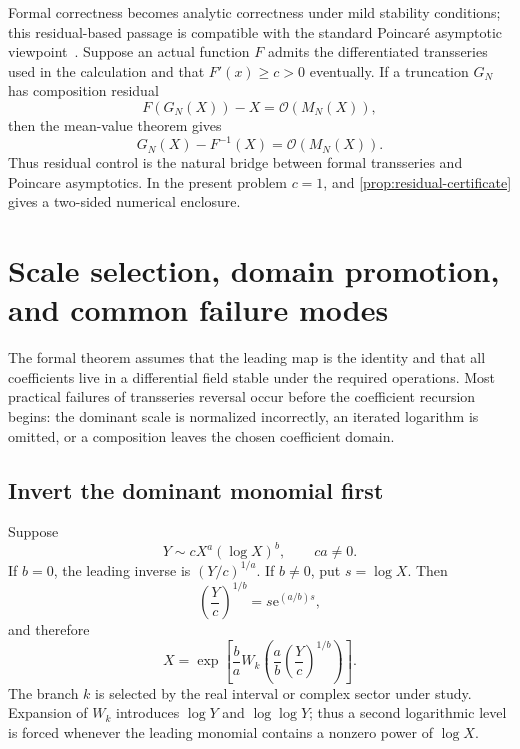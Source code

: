 \documentclass[11pt,a4paper]{article}
\numberwithin{equation}{section}
\theoremstyle{definition}
\theoremstyle{remark}
\newcommand{\e}{\mathrm e}
\newcommand{\Ord}{\mathcal O}
\begin{document}
Formal correctness becomes analytic correctness under mild stability
conditions; this residual-based passage is compatible with the standard
Poincar\'e asymptotic viewpoint~\cite{Olver}.  Suppose an actual function \(F\) admits the differentiated
transseries used in the calculation and that \(F'(x)\ge c>0\) eventually.
If a truncation \(G_N\) has composition residual
\begin{equation}\label{eq:formal-to-actual-residual}
  F(G_N(X))-X=\Ord(M_N(X)),
\end{equation}
then the mean-value theorem gives
\begin{equation}\label{eq:formal-to-actual-error}
  G_N(X)-F^{-1}(X)=\Ord(M_N(X)).
\end{equation}
Thus residual control is the natural bridge between formal transseries and
Poincare asymptotics.  In the present problem \(c=1\), and
\cref{prop:residual-certificate} gives a two-sided numerical enclosure.

\section{Scale selection, domain promotion, and common failure modes}

The formal theorem assumes that the leading map is the identity and that
all coefficients live in a differential field stable under the required
operations.  Most practical failures of transseries reversal occur before
the coefficient recursion begins: the dominant scale is normalized
incorrectly, an iterated logarithm is omitted, or a composition leaves the
chosen coefficient domain.

\subsection{Invert the dominant monomial first}

Suppose
\begin{equation}\label{eq:dominant-power-log}
  Y\sim cX^a(\log X)^b,
  \qquad ca\ne0.
\end{equation}
If \(b=0\), the leading inverse is \((Y/c)^{1/a}\).  If \(b\ne0\), put
\(s=\log X\).  Then
\[
  \left(\frac{Y}{c}\right)^{1/b}=s\e^{(a/b)s},
\]
and therefore
\begin{equation}\label{eq:power-log-leading-inverse}
  X=\exp\!\left[
  \frac ba W_k\!\left(
  \frac ab\left(\frac{Y}{c}\right)^{1/b}
  \right)\right].
\end{equation}
The branch \(k\) is selected by the real interval or complex sector under
study.  Expansion of \(W_k\) introduces \(\log Y\) and
\(\log\log Y\); thus a second logarithmic level is forced whenever the
leading monomial contains a nonzero power of \(\log X\).
\end{document}
